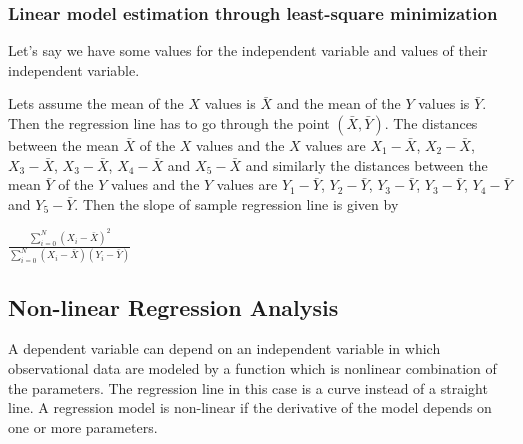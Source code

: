\documentclass[a4paper]{aitthesis}
\begin{document}
\subsubsection{Linear model estimation through least-square minimization}
Let's say we have some values for the independent variable and values of their independent variable.

Lets assume the mean of the $X$ values is $\bar{X}$ and the mean of the $Y$ values is $\bar{Y}$. Then the regression line has to go through the point $(\bar{X},\bar{Y})$. The distances between the mean $\bar{X}$ of the $X$ values and the $X$ values  are $X_1 - \bar{X}$, $X_2 - \bar{X}$, $X_3 - \bar{X}$, $X_3 - \bar{X}$, $X_4 - \bar{X}$ and $X_5 - \bar{X}$ and similarly the distances between the mean $\bar{Y}$ of the $Y$ values and the $Y$ values are $Y_1 - \bar{Y}$, $Y_2 - \bar{Y}$, $Y_3 - \bar{Y}$, $Y_3 - \bar{Y}$, $Y_4 - \bar{Y}$ and $Y_5 - \bar{Y}$. Then the slope of sample regression line is given by \newline
\begin{center}
\Large \textbf{$\frac{\sum_{i = 0}^{N}(X_i - \bar{X})^2}{\sum_{i = 0}^{N}(X_i - \bar{X}) (Y_i - \bar{Y})}$}
\end{center}

\subsection{Non-linear Regression Analysis}
A dependent variable can depend on an independent variable in which observational data are modeled by a function which is nonlinear combination of the parameters. The regression line in this case is a curve instead of a straight line. A regression model is non-linear if the derivative of the model depends on one or more parameters.
\end{document}
